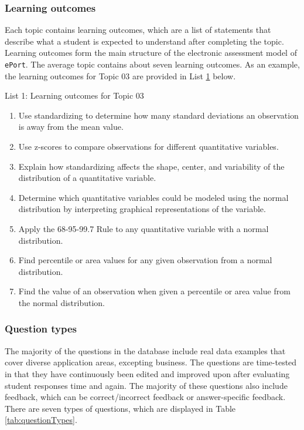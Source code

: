 \documentclass{article}\usepackage[]{graphicx}\usepackage[]{color}
\numberwithin{equation}{section} %
\begin{document}
\subsubsection{Learning outcomes}

Each topic contains learning outcomes, which are a list of statements that describe what a student is expected to understand after completing the topic. Learning outcomes form the main structure of the electronic assessment model of \texttt{ePort}. The average topic contains about seven learning outcomes. As an example, the learning outcomes for Topic 03 are provided in List \hyperref[sec:lo]{1} below.

\newpage
\centerline{List 1: Learning outcomes for Topic 03}
\vspace{-2mm}
\begin{framed}
\begin{enumerate}[label=\Alph*.]
\label{sec:lo}
\item Use standardizing to determine how many standard deviations an observation is away from the mean value.
\item Use z-scores to compare observations for different quantitative variables.
\item Explain how standardizing affects the shape, center, and variability of the distribution of a quantitative variable.
\item Determine which quantitative variables could be modeled using the normal distribution by interpreting graphical representations of the variable.
\item Apply the 68-95-99.7 Rule to any quantitative variable with a normal distribution.
\item Find percentile or area values for any given observation from a normal distribution.
\item Find the value of an observation when given a percentile or area value from the normal distribution.
\end{enumerate}
\end{framed}

\subsubsection{Question types}

The majority of the questions in the database include real data examples that cover diverse application areas, excepting business. The questions are time-tested in that they have continuously been edited and improved upon after evaluating student responses time and again. The majority of these questions also include feedback, which can be correct/incorrect feedback or answer-specific feedback. There are seven types of questions, which are displayed in Table \ref{tab:questionTypes}.
\end{document}
